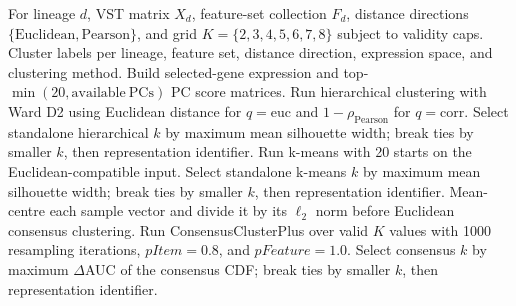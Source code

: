 \begin{algorithm}[H]
\caption{Clustering and consensus clustering}
\label{alg:supp_clustering_consensus}
\small
\begin{algorithmic}[1]
\Require For lineage \(d\), VST matrix \(X_d\), feature-set collection \(F_d\), distance directions \(\{\mathrm{Euclidean},\mathrm{Pearson}\}\), and grid \(K=\{2,3,4,5,6,7,8\}\) subject to validity caps.
\Ensure Cluster labels per lineage, feature set, distance direction, expression space, and clustering method.
    \State Build selected-gene expression and top-\(\min(20,\mathrm{available\ PCs})\) PC score matrices.
      \State Run hierarchical clustering with Ward D2 using Euclidean distance for \(q=\mathrm{euc}\) and \(1-\rho_{\mathrm{Pearson}}\) for \(q=\mathrm{corr}\).
      \State Select standalone hierarchical \(k\) by maximum mean silhouette width; break ties by smaller \(k\), then representation identifier.
        \State Run k-means with 20 starts on the Euclidean-compatible input.
        \State Select standalone k-means \(k\) by maximum mean silhouette width; break ties by smaller \(k\), then representation identifier.
      \EndIf
        \State Mean-centre each sample vector and divide it by its \(\ell_2\) norm before Euclidean consensus clustering.
      \EndIf
      \State Run ConsensusClusterPlus over valid \(K\) values with 1000 resampling iterations, \(pItem=0.8\), and \(pFeature=1.0\).
      \State Select consensus \(k\) by maximum \(\Delta\)AUC of the consensus CDF; break ties by smaller \(k\), then representation identifier.
    \EndFor
  \EndFor
\EndFor
\end{algorithmic}
\end{algorithm}

